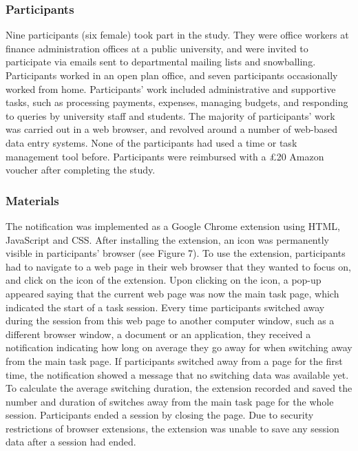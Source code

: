 \subsubsection{Participants}
Nine participants (six female) took part in the study. They were office workers at finance administration offices at a public university, and were invited to participate via emails sent to departmental mailing lists and snowballing. Participants worked in an open plan office, and seven participants occasionally worked from home. Participants’ work included administrative and supportive tasks, such as processing payments, expenses, managing budgets, and responding to queries by university staff and students. The majority of participants’ work was carried out in a web browser, and revolved around a number of web-based data entry systems. None of the participants had used a time or task management tool before. Participants were reimbursed with a  \pounds 20 Amazon voucher after completing the study. 


\subsubsection{Materials}
The notification was implemented as a Google Chrome extension using HTML, JavaScript and CSS. After installing the extension, an icon was permanently visible in participants’ browser (see Figure 7). To use the extension, participants had to navigate to a web page in their web browser that they wanted to focus on, and click on the icon of the extension. Upon clicking on the icon, a pop-up appeared saying that the current web page was now the main task page, which indicated the start of a task session. Every time participants switched away during the session from this web page to another computer window, such as a different browser window, a document or an application, they received a notification indicating how long on average they go away for when switching away from the main task page. If participants switched away from a page for the first time, the notification showed a message that no switching data was available yet. To calculate the average switching duration, the extension recorded and saved the number and duration of switches away from the main task page for the whole session. Participants ended a session by closing the page. Due to security restrictions of browser extensions, the extension was unable to save any session data after a session had ended. 

